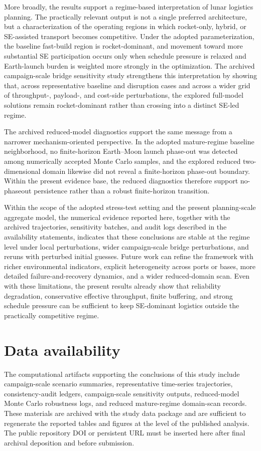 \documentclass[12pt]{article}
\begin{document}
More broadly, the results support a regime-based interpretation of lunar logistics planning. The practically relevant output is not a single preferred architecture, but a characterization of the operating regions in which rocket-only, hybrid, or SE-assisted transport becomes competitive. Under the adopted parameterization, the baseline fast-build region is rocket-dominant, and movement toward more substantial SE participation occurs only when schedule pressure is relaxed and Earth-launch burden is weighted more strongly in the optimization. The archived campaign-scale bridge sensitivity study strengthens this interpretation by showing that, across representative baseline and disruption cases and across a wider grid of throughput-, payload-, and cost-side perturbations, the explored full-model solutions remain rocket-dominant rather than crossing into a distinct SE-led regime.

The archived reduced-model diagnostics support the same message from a narrower mechanism-oriented perspective. In the adopted mature-regime baseline neighborhood, no finite-horizon Earth--Moon launch phase-out was detected among numerically accepted Monte Carlo samples, and the explored reduced two-dimensional domain likewise did not reveal a finite-horizon phase-out boundary. Within the present evidence base, the reduced diagnostics therefore support no-phaseout persistence rather than a robust finite-horizon transition.

Within the scope of the adopted stress-test setting and the present planning-scale aggregate model, the numerical evidence reported here, together with the archived trajectories, sensitivity batches, and audit logs described in the availability statements, indicates that these conclusions are stable at the regime level under local perturbations, wider campaign-scale bridge perturbations, and reruns with perturbed initial guesses. Future work can refine the framework with richer environmental indicators, explicit heterogeneity across ports or bases, more detailed failure-and-recovery dynamics, and a wider reduced-domain scan. Even with these limitations, the present results already show that reliability degradation, conservative effective throughput, finite buffering, and strong schedule pressure can be sufficient to keep SE-dominant logistics outside the practically competitive regime.


\section*{Data availability}
The computational artifacts supporting the conclusions of this study include campaign-scale scenario summaries, representative time-series trajectories, consistency-audit ledgers, campaign-scale sensitivity outputs, reduced-model Monte Carlo robustness logs, and reduced mature-regime domain-scan records. These materials are archived with the study data package and are sufficient to regenerate the reported tables and figures at the level of the published analysis. The public repository DOI or persistent URL must be inserted here after final archival deposition and before submission.
\end{document}
